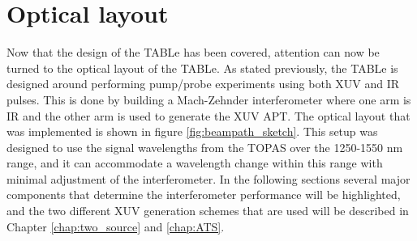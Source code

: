 \section{Optical layout}
\label{sec:optical_layout}

Now that the design of the TABLe has been covered, attention can now be turned to the optical layout of the TABLe.  As stated previously, the TABLe is designed around performing pump/probe experiments using both XUV and IR pulses.  This is done by building a Mach-Zehnder interferometer where one arm is IR and the other arm is used to generate the XUV APT.  The optical layout that was implemented is shown in figure \ref{fig:beampath_sketch}.  This setup was designed to use the signal wavelengths from the TOPAS over the 1250-1550 nm range, and it can accommodate a wavelength change within this range with minimal adjustment of the interferometer.  In the following sections several major components that determine the interferometer performance will be highlighted, and the two different XUV generation schemes that are used will be described in Chapter \ref{chap:two_source} and \ref{chap:ATS}.

